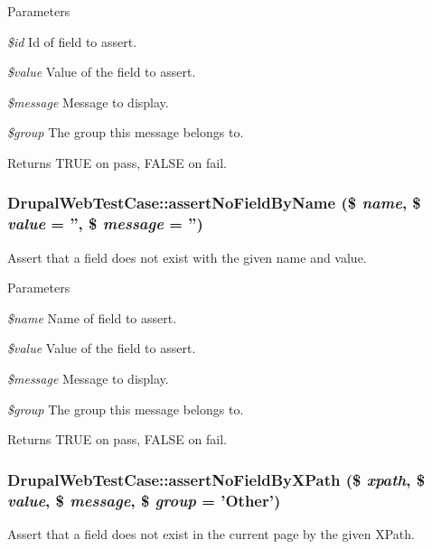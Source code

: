 \begin{DoxyParams}{Parameters}
\item[{\em \$id}]Id of field to assert. \item[{\em \$value}]Value of the field to assert. \item[{\em \$message}]Message to display. \item[{\em \$group}]The group this message belongs to. \end{DoxyParams}
\begin{DoxyReturn}{Returns}
TRUE on pass, FALSE on fail. 
\end{DoxyReturn}
\hypertarget{class_drupal_web_test_case_a323f24e8b6dcf37ae100ad7102ee85db}{
\subsubsection[{assertNoFieldByName}]{\setlength{\rightskip}{0pt plus 5cm}DrupalWebTestCase::assertNoFieldByName (\$ {\em name}, \/  \$ {\em value} = {\ttfamily ''}, \/  \$ {\em message} = {\ttfamily ''})}}
\label{class_drupal_web_test_case_a323f24e8b6dcf37ae100ad7102ee85db}
Assert that a field does not exist with the given name and value.


\begin{DoxyParams}{Parameters}
\item[{\em \$name}]Name of field to assert. \item[{\em \$value}]Value of the field to assert. \item[{\em \$message}]Message to display. \item[{\em \$group}]The group this message belongs to. \end{DoxyParams}
\begin{DoxyReturn}{Returns}
TRUE on pass, FALSE on fail. 
\end{DoxyReturn}
\hypertarget{class_drupal_web_test_case_a8997cdd692056a6b4d1f79ced1dcf692}{
\subsubsection[{assertNoFieldByXPath}]{\setlength{\rightskip}{0pt plus 5cm}DrupalWebTestCase::assertNoFieldByXPath (\$ {\em xpath}, \/  \$ {\em value}, \/  \$ {\em message}, \/  \$ {\em group} = {\ttfamily 'Other'})}}
\label{class_drupal_web_test_case_a8997cdd692056a6b4d1f79ced1dcf692}
Assert that a field does not exist in the current page by the given XPath.


